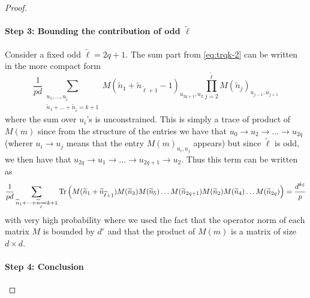 \documentclass[letterpaper, 10pt, dvipsnames]{article}
\numberwithin{equation}{section}
\renewcommand{\tilde}{\widetilde}
\let\O\relax
\newcommand{\O}[1]{\mathcal{O}\left(#1\right)}
\newcommand{\nt}{\tilde{n}}
\theoremstyle{definition}
\begin{document}
\begin{proof}
  \paragraph{Step 3: Bounding the contribution of odd $\tilde{\ell}$} Consider a fixed odd $\tilde{\ell}=2q+1$. The sum part from \eqref{eq:trqk-2} can be written in the more compact form 
  \[
  \frac{1}{pd}\sum_{\substack{u_1,\dots,u_{\tilde{\ell}}\\ \nt_1+\dots+\nt_{\tilde{\ell}}=k+1}}
  M(\nt_1+\nt_{\tilde{\ell}+1}-1)_{u_{2q+1},u_2}
  \prod_{j=2}^{\tilde{\ell}} M(\nt_j)_{u_{j-1},u_{j+1}}
  \]
  where the sum over $u_i$'s is unconstrained. This is simply a trace of product of $M(m)$ since from the structure of the entries we have that $u_0 \to u_2 \to \dots \to u_{2q}$ (wherer $u_i\to u_j$ means that the entry $M(m)_{u_i,u_j}$ appears) but since $\tilde{\ell}$ is odd, we then have that $u_{2q}\to u_1 \to \dots \to u_{2q+1} \to u_2$. Thus this term can be written as 
  \[
  \frac{1}{pd}\sum_{\nt_1+\dots+\nt_{\tilde{\ell}}=k+1}
  \mathrm{Tr}\left(
    M(\nt_1+\nt_{\tilde{\ell}+1})
    M(\nt_3)M(\nt_5)\dots M(\nt_{2q+1})M(\nt_2)M(\nt_4)\dots M(\nt_{2q})
  \right)
  =
  \O{
    \frac{d^{k\varepsilon}}{p}
  }
  \]
  with very high probability where we used the fact that the operator norm of each matrix $M$ is bounded by $d^{\varepsilon}$ and that the product of $M(m)$ is a matrix of size $d\times d$.
  \paragraph{Step 4: Conclusion}


\end{proof}
\end{document}
